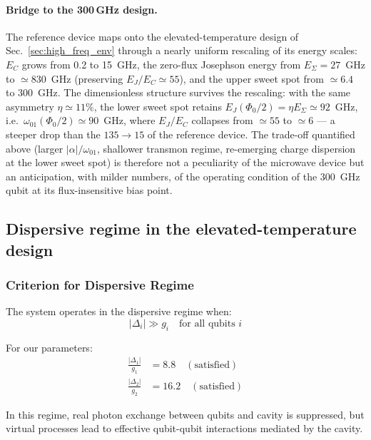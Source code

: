 \paragraph{Bridge to the 300\,GHz design.}
The reference device maps onto the elevated-temperature design of
Sec.~\ref{sec:high_freq_env} through a nearly uniform rescaling of its
energy scales: $E_C$ grows from 0.2 to 15~GHz, the zero-flux Josephson
energy from $E_\Sigma = 27$~GHz to $\simeq 830$~GHz (preserving
$E_J/E_C \simeq 55$), and the upper sweet spot from $\simeq 6.4$ to
300~GHz. The dimensionless structure survives the rescaling: with the
same asymmetry $\eta \simeq 11\%$, the lower sweet spot retains
$E_J(\Phi_0/2) = \eta E_\Sigma \simeq 92$~GHz, i.e.\
$\omega_{01}(\Phi_0/2) \simeq 90$~GHz, where $E_J/E_C$ collapses from
$\simeq 55$ to $\simeq 6$ --- a steeper drop than the $135 \to 15$ of the
reference device. The trade-off quantified above (larger
$|\alpha|/\omega_{01}$, shallower transmon regime, re-emerging charge
dispersion at the lower sweet spot) is therefore not a peculiarity of the
microwave device but an anticipation, with milder numbers, of the
operating condition of the 300~GHz qubit at its flux-insensitive bias
point.

\subsection{Dispersive regime in the elevated-temperature design}
\label{sec:dispersive}
\label{sub:tqi_dispersive}

\subsubsection{Criterion for Dispersive Regime}

The system operates in the dispersive regime when:
\begin{equation}
|\Delta_i| \gg g_i \quad \text{for all qubits } i
\end{equation}

For our parameters:
\begin{align}
\frac{|\Delta_1|}{g_1} &= 8.8 \quad (\text{satisfied})\\
\frac{|\Delta_2|}{g_2} &= 16.2 \quad (\text{satisfied})
\end{align}

In this regime, real photon exchange between qubits and cavity is suppressed, but virtual processes lead to effective qubit-qubit interactions mediated by the cavity.

